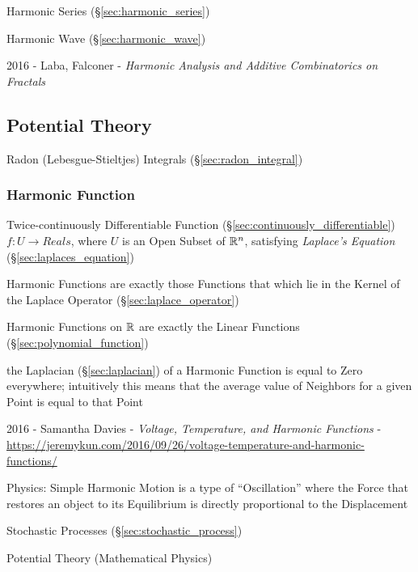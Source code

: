\fist Harmonic Series (\S\ref{sec:harmonic_series})

\fist Harmonic Wave (\S\ref{sec:harmonic_wave})

2016 - Laba, Falconer - \emph{Harmonic Analysis and Additive Combinatorics on
  Fractals}



\subsection{Potential Theory}\label{sec:potential_theory}

Radon (Lebesgue-Stieltjes) Integrals (\S\ref{sec:radon_integral})



\subsubsection{Harmonic Function}\label{sec:harmonic_function}

Twice-continuously Differentiable Function
(\S\ref{sec:continuously_differentiable}) $f : U \rightarrow Reals$,
where $U$ is an Open Subset of $\mathbb{R}^n$, satisfying \emph{Laplace's
  Equation} (\S\ref{sec:laplaces_equation})

Harmonic Functions are exactly those Functions that which lie in the Kernel of
the Laplace Operator (\S\ref{sec:laplace_operator})

Harmonic Functions on $\mathbb{R}$ are exactly the Linear Functions
(\S\ref{sec:polynomial_function})

the Laplacian (\S\ref{sec:laplacian}) of a Harmonic Function is equal to Zero
everywhere; intuitively this means that the average value of Neighbors for a
given Point is equal to that Point

2016 - Samantha Davies - \emph{Voltage, Temperature, and Harmonic
  Functions} -
\url{https://jeremykun.com/2016/09/26/voltage-temperature-and-harmonic-functions/}

Physics: Simple Harmonic Motion is a type of ``Oscillation'' where the
Force that restores an object to its Equilibrium is directly
proportional to the Displacement

Stochastic Processes (\S\ref{sec:stochastic_process})

Potential Theory (Mathematical Physics) %


